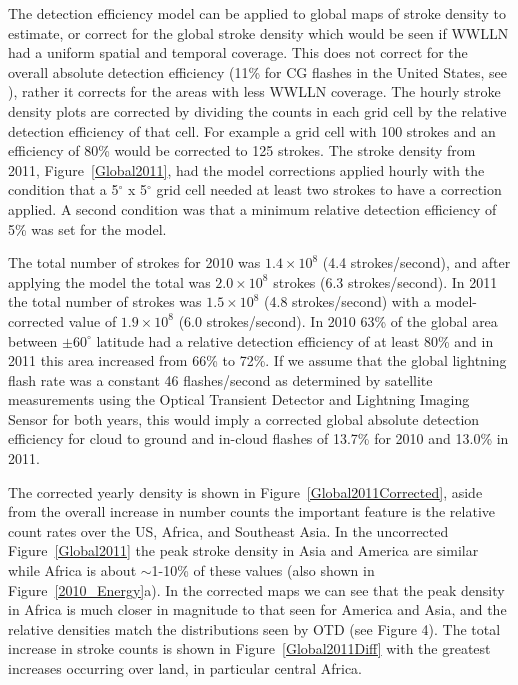 \documentclass[draft,ras]{agutex}
\begin{document}
\begin{article}
The detection efficiency model can be applied to global maps of stroke density to estimate, or correct for the global stroke density which would be seen if WWLLN had a uniform spatial and temporal coverage. This does not correct for the overall absolute detection efficiency (11\% for CG flashes in the United States, see \citet{Abarca2010}), rather it corrects for the areas with less WWLLN coverage. The hourly stroke density plots are corrected by dividing the counts in each grid cell by the relative detection efficiency of that cell. For example a grid cell with 100 strokes and an efficiency of 80\% would be corrected to 125 strokes. The stroke density from 2011, Figure~\ref{Global2011}, had the model corrections applied hourly with the condition that a 5$^\circ$ x 5$^\circ$ grid cell needed at least two strokes to have a correction applied. A second condition was that a minimum relative detection efficiency of 5\% was set for the model. 

The total number of strokes for 2010 was $1.4\times10^8$ (4.4 strokes/second), and after applying the model the total was $2.0\times10^8$ strokes (6.3 strokes/second). In 2011 the total number of strokes was $1.5\times10^8$ (4.8 strokes/second) with a model-corrected value of $1.9\times10^8$ (6.0 strokes/second). In 2010 63\% of the global area between $\pm60^\circ$ latitude had a relative detection efficiency of at least 80\% and in 2011 this area increased from 66\% to 72\%. If we assume that the global lightning flash rate was a constant 46 flashes/second as determined by satellite measurements using the Optical Transient Detector and Lightning Imaging Sensor \citep{Cecil2011, Christian2003} for both years, this would imply a corrected global absolute detection efficiency for cloud to ground and in-cloud flashes of 13.7\% for 2010 and 13.0\% in 2011.

The corrected yearly density is shown in Figure~\ref{Global2011Corrected}, aside from the overall increase in number counts the important feature is the relative count rates over the US, Africa, and Southeast Asia. In the uncorrected Figure~\ref{Global2011} the peak stroke density in Asia and America are similar while Africa is about $\sim$1-10\% of these values (also shown in Figure~\ref{2010_Energy}a). In the corrected maps we can see that the peak density in Africa is much closer in magnitude to that seen for America and Asia, and the relative densities match the distributions seen by OTD (see \citet{Christian2003} Figure 4). The total increase in stroke counts is shown in Figure~\ref{Global2011Diff} with the greatest increases occurring over land, in particular central Africa.


\end{article}
\end{document}
